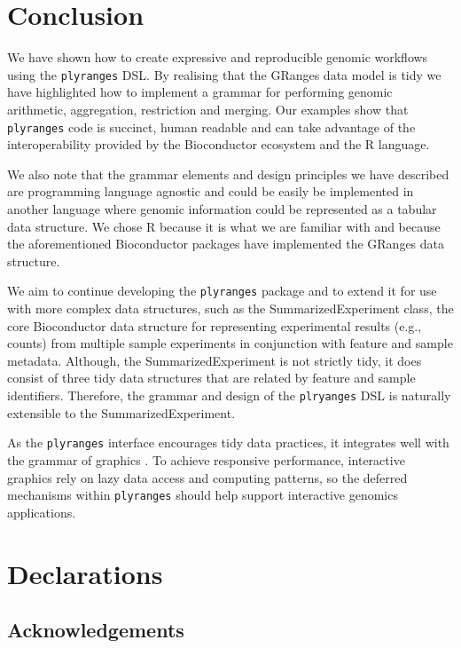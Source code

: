 \documentclass[]{article}
\begin{document}
\hypertarget{conclusion}{%
\section{Conclusion}\label{conclusion}}

We have shown how to create expressive and reproducible genomic
workflows using the \texttt{plyranges} DSL. By realising that the
GRanges data model is tidy we have highlighted how to implement a
grammar for performing genomic arithmetic, aggregation, restriction and
merging. Our examples show that \texttt{plyranges} code is succinct,
human readable and can take advantage of the interoperability provided
by the Bioconductor ecosystem and the R language.

We also note that the grammar elements and design principles we have
described are programming language agnostic and could be easily be
implemented in another language where genomic information could be
represented as a tabular data structure. We chose R because it is what
we are familiar with and because the aforementioned Bioconductor
packages have implemented the GRanges data structure.

We aim to continue developing the \texttt{plyranges} package and to
extend it for use with more complex data structures, such as the
SummarizedExperiment class, the core Bioconductor data structure for
representing experimental results (e.g., counts) from multiple sample
experiments in conjunction with feature and sample metadata. Although,
the SummarizedExperiment is not strictly tidy, it does consist of three
tidy data structures that are related by feature and sample identifiers.
Therefore, the grammar and design of the \texttt{plryanges} DSL is
naturally extensible to the SummarizedExperiment.

As the \texttt{plyranges} interface encourages tidy data practices, it
integrates well with the grammar of graphics \cite{Wickham2016-gz}. To
achieve responsive performance, interactive graphics rely on lazy data
access and computing patterns, so the deferred mechanisms within
\texttt{plyranges} should help support interactive genomics
applications.

\hypertarget{declarations}{%
\section{Declarations}\label{declarations}}

\hypertarget{acknowledgements}{%
\subsection{Acknowledgements}\label{acknowledgements}}
\end{document}
